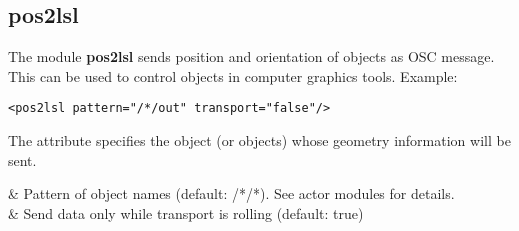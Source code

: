 \subsection{pos2lsl}\label{sec:pos2lsl}

The module {\bf pos2lsl} sends position and orientation of \tascar{}
objects as OSC message. This can be used to control objects in
computer graphics tools. Example:
\begin{lstlisting}[numbers=none]
<pos2lsl pattern="/*/out" transport="false"/>
\end{lstlisting}
The  attribute specifies the object (or objects) whose geometry information will be sent.
%

\begin{tscattributes}
   & Pattern of \tascar{} object names (default: /*/*). See actor modules for details. \\
 & Send data only while transport is rolling (default: true)                         \\
\end{tscattributes}

